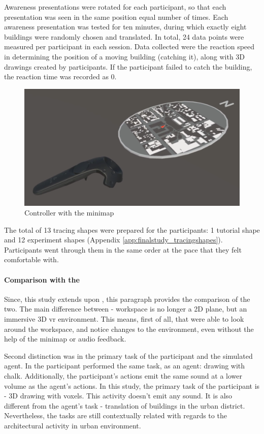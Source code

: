 Awareness presentations were rotated for each participant, so that each presentation was seen in the same position equal number of times. 
Each awareness presentation was tested for ten minutes, during which exactly eight buildings were randomly chosen and translated. In total, 24 data points were measured per participant in each session. Data collected were the reaction speed in determining the position of a moving building (catching it), along with 3D drawings created by participants. If the participant failed to catch the building, the reaction time was recorded as 0.

\begin{figure}[h]
	\centering
	\includegraphics[width=0.7\linewidth]{figures/minimap_controller}
	\caption{Controller with the minimap}
	\label{fig:minimap_controller}
\end{figure}

The total of 13 tracing shapes were prepared for the participants: 1 tutorial shape and 12 experiment shapes (Appendix \ref{app:finalstudy_tracingshapes}).
Participants went through them in the same order at the pace that they felt comfortable with.

\paragraph{Comparison with the }
Since, this study extends upon \parencite{gutwin_chalk_2011}, this paragraph provides the comparison of the two.
The main difference between - workspace is no longer a 2D plane, but an immersive 3D \gls{vr} environment. This means, first of all, that were able to look around the workspace, and notice changes to the environment, even without the help of the minimap or audio feedback. 

Second distinction was in the primary task of the participant and the simulated agent. In \parencite{gutwin_chalk_2011} the participant performed the same task, as an agent: drawing with chalk. Additionally, the participant's actions emit the same sound at a lower volume as the agent's actions. In this study, the primary task of the participant is - 3D drawing with voxels. This activity doesn't emit any sound. It is also different from the agent's task - translation of buildings in the urban district. Nevertheless, the tasks are still contextually related with regards to the architectural activity in urban environment.


